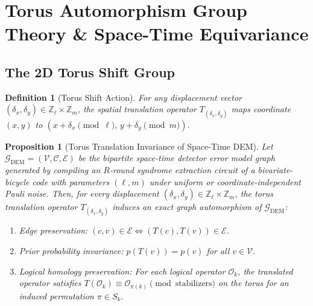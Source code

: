\documentclass[journal]{IEEEtran}
\newtheorem{definition}{Definition}
\newtheorem{proposition}{Proposition}
\begin{document}
\section{Torus Automorphism Group Theory \& Space-Time Equivariance}

\subsection{The 2D Torus Shift Group}
\begin{definition}[Torus Shift Action]
For any displacement vector $(\delta_x, \delta_y) \in \mathbb{Z}_\ell \times \mathbb{Z}_m$, the spatial translation operator $T_{(\delta_x, \delta_y)}$ maps coordinate $(x, y)$ to $(x + \delta_x \pmod \ell, \, y + \delta_y \pmod m)$.
\end{definition}

\begin{proposition}[Torus Translation Invariance of Space-Time DEM]
\label{thm:automorphism}
Let $\mathcal{G}_{\text{DEM}} = (\mathcal{V}, \mathcal{C}, \mathcal{E})$ be the bipartite space-time detector error model graph generated by compiling an $R$-round syndrome extraction circuit of a bivariate-bicycle code with parameters $(\ell, m)$ under uniform or coordinate-independent Pauli noise. Then, for every displacement $(\delta_x, \delta_y) \in \mathbb{Z}_\ell \times \mathbb{Z}_m$, the torus translation operator $T_{(\delta_x, \delta_y)}$ induces an exact graph automorphism of $\mathcal{G}_{\text{DEM}}$:
\begin{enumerate}
    \item Edge preservation: $(c, v) \in \mathcal{E} \iff (T(c), T(v)) \in \mathcal{E}$.
    \item Prior probability invariance: $p(T(v)) = p(v)$ for all $v \in \mathcal{V}$.
    \item Logical homology preservation: For each logical operator $\mathcal{O}_k$, the translated operator satisfies $T(\mathcal{O}_k) \equiv \mathcal{O}_{\pi(k)} \pmod{\text{stabilizers}}$ on the torus for an induced permutation $\pi \in S_k$.
\end{enumerate}
\end{proposition}
\end{document}
